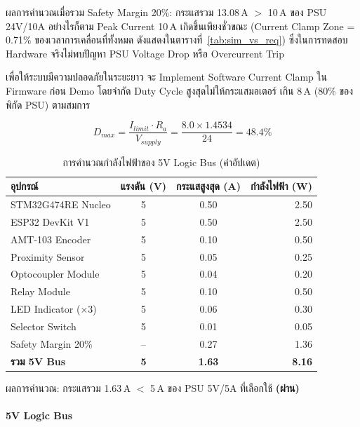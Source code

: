 ผลการคำนวณเมื่อรวม Safety Margin 20\%:
กระแสรวม 13.08\,A $>$ 10\,A ของ PSU 24V/10A
อย่างไรก็ตาม Peak Current 10\,A เกิดขึ้นเพียงชั่วขณะ
(Current Clamp Zone = 0.71\% ของเวลาการเคลื่อนที่ทั้งหมด
ดังแสดงในตารางที่~\ref{tab:sim_vs_req})
ซึ่งในการทดสอบ Hardware จริงไม่พบปัญหา
PSU Voltage Drop หรือ Overcurrent Trip

เพื่อให้ระบบมีความปลอดภัยในระยะยาว
จะ Implement Software Current Clamp
ใน Firmware ก่อน Demo โดยจำกัด
Duty Cycle สูงสุดไม่ให้กระแสมอเตอร์
เกิน 8\,A (80\% ของพิกัด PSU)
ตามสมการ

\begin{equation}
  D_{max} = \frac{I_{limit} \cdot R_a}{V_{supply}}
           = \frac{8.0 \times 1.4534}{24}
           = 48.4\%
  \label{eq:duty_clamp}
\end{equation}

\begin{table}[H]
  \centering
  \caption{การคำนวณกำลังไฟฟ้าของ 5V Logic Bus (ค่าอัปเดต)}
  \label{tab:power_5v}
  \begin{tabular}{lccr}
    \toprule
    อุปกรณ์ & แรงดัน (V) & กระแสสูงสุด (A) & กำลังไฟฟ้า (W) \\
    \midrule
    STM32G474RE Nucleo & 5 & 0.50 &  2.50 \\
    ESP32 DevKit V1    & 5 & 0.50 &  2.50 \\
    AMT-103 Encoder    & 5 & 0.10 &  0.50 \\
    Proximity Sensor   & 5 & 0.05 &  0.25 \\
    Optocoupler Module & 5 & 0.04 &  0.20 \\
    Relay Module       & 5 & 0.10 &  0.50 \\
    LED Indicator (×3) & 5 & 0.06 &  0.30 \\
    Selector Switch    & 5 & 0.01 &  0.05 \\
    \midrule
    Safety Margin 20\% & -- & 0.27 &  1.36 \\
    \midrule
    \textbf{รวม 5V Bus}
      & \textbf{5} & \textbf{1.63} & \textbf{8.16} \\
    \bottomrule
  \end{tabular}
\end{table}

ผลการคำนวณ: กระแสรวม 1.63\,A $<$ 5\,A ของ
PSU 5V/5A ที่เลือกใช้ \textbf{(ผ่าน)}

\paragraph{5V Logic Bus}

